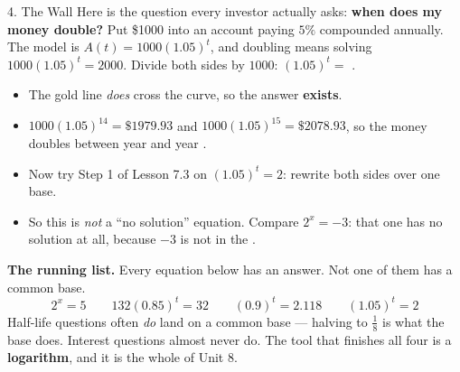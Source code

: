 \documentclass[10pt]{article}
\begin{document}
\boxguard[30]
\begin{notesbox}{4. The Wall}
Here is the question every investor actually asks: \textbf{when does my money double?} Put \$1000 into
an account paying $5\%$ compounded annually. The model is $A(t)=1000(1.05)^{t}$, and doubling means
solving $1000(1.05)^{t}=2000$. Divide both sides by $1000$: \; $(1.05)^{t}=$ \blank{1.2cm}.

\vspace{3pt}

\begin{center}
\begin{minipage}[c]{0.46\linewidth}
\centering
{}
\end{minipage}
\begin{minipage}[c]{0.50\linewidth}
\small
\begin{itemize}[leftmargin=1.3em, itemsep=2pt]
  \item The gold line \emph{does} cross the curve, so the answer \textbf{exists}.
  \item $1000(1.05)^{14}=\$1979.93$ and $1000(1.05)^{15}=\$2078.93$, so the money doubles between year
        \blank{1.0cm} and year \blank{1.0cm}.
  \item Now try Step 1 of Lesson 7.3 on $(1.05)^{t}=2$: rewrite both sides over one base.
        \blank{4.6cm}
  \item So this is \emph{not} a ``no solution'' equation. Compare $2^{x}=-3$: that one has no solution
        at all, because $-3$ is not in the \blank{2.0cm}.
\end{itemize}
\end{minipage}
\end{center}

\vspace{3pt}
\begin{tcolorbox}[colback=redbg, colframe=redacc, boxrule=0.8pt, arc=1.5mm,
    left=2.5mm, right=2.5mm, top=1.5mm, bottom=1.5mm]
\textbf{The running list.} Every equation below has an answer. Not one of them has a common base.
\[
  2^{x}=5 \qquad 132(0.85)^{t}=32 \qquad (0.9)^{t}=2.118 \qquad (1.05)^{t}=2
\]
Half-life questions often \emph{do} land on a common base --- halving to $\frac18$ is what the base
does. Interest questions almost never do. The tool that finishes all four is a \textbf{logarithm}, and
it is the whole of Unit 8.
\end{tcolorbox}
\end{notesbox}
\end{document}
